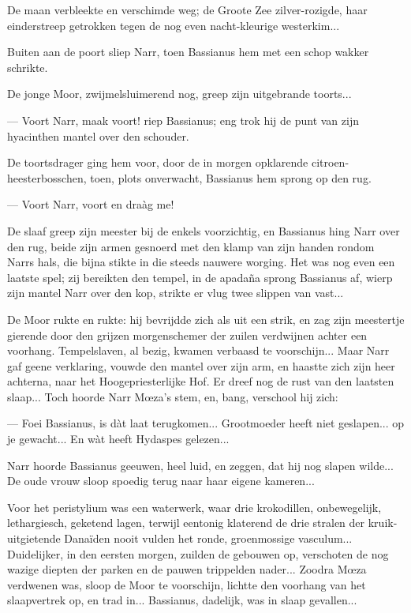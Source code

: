 \documentclass[a4paper, 12pt, oneside, dutch]{article}
\begin{document}
De maan verbleekte en verschimde weg; de Groote Zee zilver-rozigde, haar einderstreep getrokken tegen de nog even nacht-kleurige westerkim...

Buiten aan de poort sliep Narr, toen Bassianus hem met een schop wakker schrikte.

De jonge Moor, zwijmelsluimerend nog, greep zijn uitgebrande toorts...

--- Voort Narr, maak voort! riep Bassianus; eng trok hij de punt van zijn hyacinthen mantel over den schouder.

De toortsdrager ging hem voor, door de in morgen opklarende citroen-heesterbosschen, toen, plots onverwacht, Bassianus hem sprong op den rug.

--- Voort Narr, voort en draàg me!

De slaaf greep zijn meester bij de enkels voorzichtig, en Bassianus hing Narr over den rug, beide zijn armen gesnoerd met den klamp van zijn handen rondom Narrs hals, die bijna stikte in die steeds nauwere worging. Het was nog even een laatste spel; zij bereikten den tempel, in de apadaña sprong Bassianus af, wierp zijn mantel Narr over den kop, strikte er vlug twee slippen van vast...

De Moor rukte en rukte: hij bevrijdde zich als uit een strik, en zag zijn meestertje gierende door den grijzen morgenschemer der zuilen verdwijnen achter een voorhang. Tempelslaven, al bezig, kwamen verbaasd te voorschijn... Maar Narr gaf geene verklaring, vouwde den mantel over zijn arm, en haastte zich zijn heer achterna, naar het Hoogepriesterlijke Hof. Er dreef nog de rust van den laatsten slaap... Toch hoorde Narr Mœza's stem, en, bang, verschool hij zich:

--- Foei Bassianus, is dàt laat terugkomen... Grootmoeder heeft niet geslapen... op je gewacht... En wàt heeft Hydaspes gelezen...

Narr hoorde Bassianus geeuwen, heel luid, en zeggen, dat hij nog slapen wilde... De oude vrouw sloop spoedig terug naar haar eigene kameren...

Voor het peristylium was een waterwerk, waar drie krokodillen, onbewegelijk, lethargiesch, geketend lagen, terwijl eentonig klaterend de drie stralen der kruik-uitgietende Danaïden nooit vulden het ronde, groenmossige vasculum... Duidelijker, in den eersten morgen, zuilden de gebouwen op, verschoten de nog wazige diepten der parken en de pauwen trippelden nader... Zoodra Mœza verdwenen was, sloop de Moor te voorschijn, lichtte den voorhang van het slaapvertrek op, en trad in... Bassianus, dadelijk, was in slaap gevallen...
\end{document}
